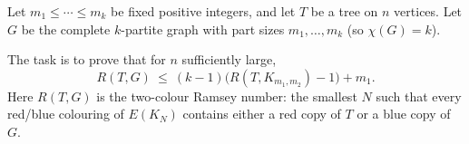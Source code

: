 Let $m_1\le \cdots \le m_k$ be fixed positive integers, and let $T$ be a tree on $n$ vertices. Let $G$ be the complete $k$-partite graph with part sizes $m_1,\dots,m_k$ (so $\chi(G)=k$).

The task is to prove that for $n$ sufficiently large,
\[
R(T,G)\ \le\ (k-1)\bigl(R(T,K_{m_1,m_2})-1\bigr)+m_1.
\]
Here $R(T,G)$ is the two-colour Ramsey number: the smallest $N$ such that every red/blue colouring of $E(K_N)$ contains either a red copy of $T$ or a blue copy of $G$.

